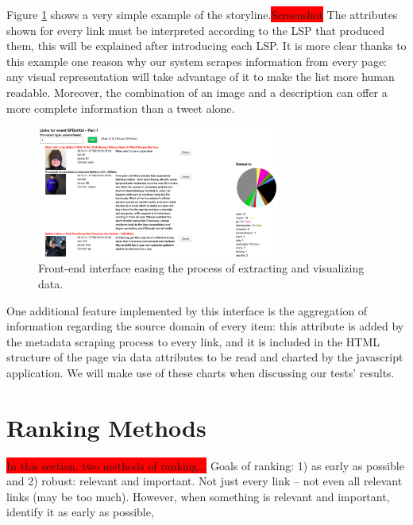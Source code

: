 \documentclass{sig-alternate}
\newcommand{\todo}[1]{\colorbox{red}{#1}}
\begin{document}
Figure \ref{fig:javascript_interface} shows a very simple example of the storyline.\todo{Screenshot} The attributes shown for every link must be interpreted according to the LSP that produced them, this will be explained after introducing each LSP. It is more clear thanks to this example one reason why our system scrapes information from every page: any visual representation will take advantage of it to make the list more human readable. Moreover, the combination of an image and a description can offer a more complete information than a tweet alone.
\begin{figure}[htbp]
  \centering
  \includegraphics[width=8cm]{Figures/javascript_interface.png}
  \caption{Front-end interface easing the process of extracting and visualizing data.}
  \label{fig:javascript_interface}
\end{figure}

One additional feature implemented by this interface is the aggregation of information regarding the source domain of every item: this attribute is added by the metadata scraping process to every link, and it is included in the HTML structure of the page via data attributes to be read and charted by the javascript application. We will make use of these charts when discussing our tests' results.

\section{Ranking Methods}
\todo{In this section, two methods of ranking...}
Goals of ranking: 1) as early as possible and 2) robust: relevant and important. Not just every link -- not even all relevant links (may be too much). However, when something is relevant and important, identify it as early as possible,  
\end{document}
